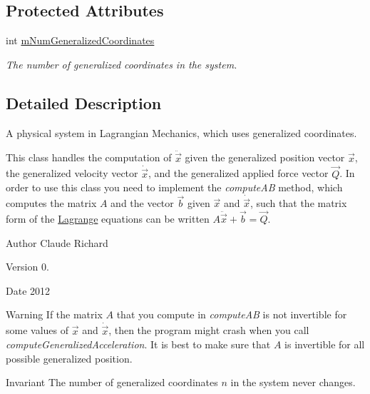 \subsection*{Protected Attributes}
\begin{DoxyCompactItemize}
\item 
int \hyperlink{class_system_aa06fade2f21b3282921a86a926f0ba1f}{m\-Num\-Generalized\-Coordinates}
\begin{DoxyCompactList}\small\item\em The number of generalized coordinates in the system. \end{DoxyCompactList}\end{DoxyCompactItemize}


\subsection{Detailed Description}
A physical system in Lagrangian Mechanics, which uses generalized coordinates. 

This class handles the computation of $ \ddot{\overrightarrow{x}} $ given the generalized position vector $ \overrightarrow{x} $, the generalized velocity vector $ \dot{\overrightarrow{x}} $, and the generalized applied force vector $ \overrightarrow{Q} $. In order to use this class you need to implement the {\itshape compute\-A\-B} method, which computes the matrix $A$ and the vector $\overrightarrow{b}$ given $ \overrightarrow{x} $ and $ \dot{\overrightarrow{x}} $, such that the matrix form of the \hyperlink{namespace_lagrange}{Lagrange} equations can be written $ A \ddot{\overrightarrow{x}} + \overrightarrow{b} = \overrightarrow{Q} $. \begin{DoxyAuthor}{Author}
Claude Richard 
\end{DoxyAuthor}
\begin{DoxyVersion}{Version}
0. 
\end{DoxyVersion}
\begin{DoxyDate}{Date}
2012 
\end{DoxyDate}
\begin{DoxyWarning}{Warning}
If the matrix $A$ that you compute in {\itshape compute\-A\-B} is not invertible for some values of $ \overrightarrow{x} $ and $ \dot{\overrightarrow{x}} $, then the program might crash when you call {\itshape compute\-Generalized\-Acceleration}. It is best to make sure that $A$ is invertible for all possible generalized position. 
\end{DoxyWarning}
\begin{DoxyInvariant}{Invariant}
The number of generalized coordinates $n$ in the system never changes. 
\end{DoxyInvariant}

